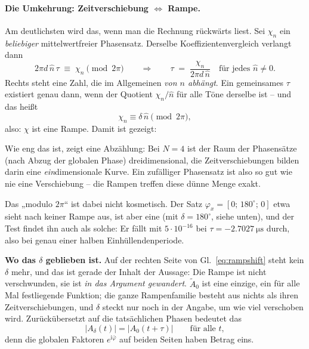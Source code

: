 \documentclass[11pt,a4paper]{article}
\begin{document}
\paragraph{Die Umkehrung: Zeitverschiebung \boldmath$\Longleftrightarrow$ Rampe.}
Am deutlichsten wird das, wenn man die Rechnung rückwärts liest. Sei
$\chi_n$ ein \emph{beliebiger} mittelwertfreier Phasensatz. Derselbe
Koeffizientenvergleich verlangt dann
\begin{equation}
  2\pi d\,\hat n\,\tau \;\equiv\; \chi_n \pmod{2\pi}
  \qquad\Longrightarrow\qquad
  \tau \;=\; \frac{\chi_n}{2\pi d\,\hat n} \quad\text{für jedes } \hat n\neq0 .
\end{equation}
Rechts steht eine Zahl, die im Allgemeinen \emph{von $n$ abhängt}. Ein
gemeinsames $\tau$ existiert genau dann, wenn der Quotient $\chi_n/\hat n$ für
alle Töne derselbe ist -- und das heißt
\begin{equation}
  \chi_n \equiv \delta\,\hat n \pmod{2\pi} ,
\end{equation}
also: $\chi$ ist eine Rampe. Damit ist gezeigt:

\medskip
\noindent{}

\medskip
\noindent Wie eng das ist, zeigt eine Abzählung: Bei $N=4$ ist der Raum der
Phasensätze (nach Abzug der globalen Phase) drei\-dimensional, die
Zeitverschiebungen bilden darin eine \emph{ein}dimensionale Kurve. Ein
zufälliger Phasensatz ist also so gut wie nie eine Verschiebung -- die
Rampen treffen diese dünne Menge exakt.

\medskip
\noindent Das „modulo $2\pi$`` ist dabei nicht kosmetisch. Der Satz
$\varphi_x = [0;\,180^\circ;\,0]$ etwa sieht nach keiner Rampe aus, ist aber
eine (mit $\delta=180^\circ$, siehe unten), und der Test findet ihn auch als
solche: Er fällt mit $5\cdot10^{-16}$ bei
$\tau=\SI{-2.7027}{\micro\second}$ durch, also bei genau einer halben
Einhüllendenperiode.

\medskip
\noindent\textbf{Wo das $\delta$ geblieben ist.} Auf der rechten Seite von
Gl.~\eqref{eq:rampshift} steht kein $\delta$ mehr, und das ist gerade der
Inhalt der Aussage: Die Rampe ist nicht verschwunden, sie ist \emph{in das
Argument gewandert}. $\tilde A_0$ ist eine einzige, ein für alle Mal
festliegende Funktion; die ganze Rampenfamilie besteht aus nichts als ihren
Zeitverschiebungen, und $\delta$ steckt nur noch in der Angabe, um wie viel
verschoben wird. Zurückübersetzt auf die tatsächlichen Phasen bedeutet das
\begin{equation}
  |A_\delta(t)| = |A_0(t+\tau)| \qquad\text{für alle } t ,
\end{equation}
denn die globalen Faktoren $e^{\mathrm{i}\bar\varphi}$ auf beiden Seiten haben
Betrag eins.
\end{document}
